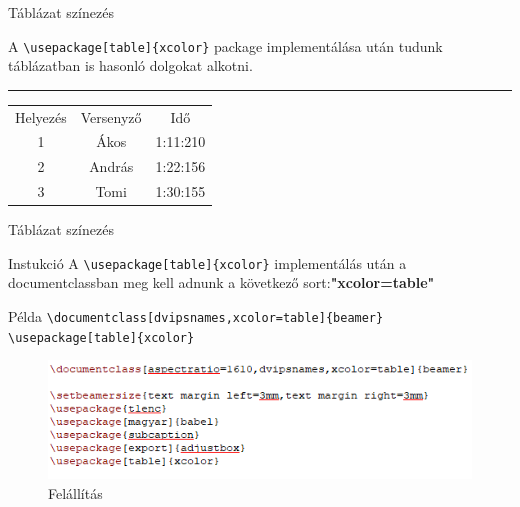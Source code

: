 \documentclass[aspectratio=1610, dvipsnames, xcolor=table]{beamer}
\begin{document}
    \begin{frame}[fragile]{Táblázat színezés}
        \begin{center}
            A \verb!\usepackage[table]{xcolor}! package implementálása után tudunk táblázatban is hasonló dolgokat alkotni.
            \noindent
            {\color{Dandelion} \rule{\linewidth}{1mm}}
        \end{center}

        \vfill
        \begin{center}
            \begin{tabular}{|c|c|c|}
                \hline
                \rowcolor{Apricot}Helyezés & Versenyző & Idő \\
                \cellcolor{ForestGreen}1 & \cellcolor{Orchid}Ákos & \cellcolor{Aquamarine}1:11:210 \\
                \cellcolor{Yellow}2  & \cellcolor{Mulberry}András & \cellcolor{Emerald}1:22:156  \\
                \cellcolor{BurntOrange}3 & \cellcolor{Plum}Tomi  &  \cellcolor{PineGreen}1:30:155 \\
                \hline
            \end{tabular}
        \end{center}
    \end{frame}

    \begin{frame}[fragile]{Táblázat színezés}
        \begin{block}{Instukció}
            A \verb!\usepackage[table]{xcolor}! implementálás után a documentclassban meg kell adnunk a következő sort:\textbf{"xcolor=table"}
        \end{block} 
        \begin{exampleblock}{Példa}
        {
            \verb!\documentclass[dvipsnames,xcolor=table]{beamer}!
            \verb!\usepackage[table]{xcolor}!
        }
        \end{exampleblock}	
        \begin{figure}[H]
            \includegraphics[scale=0.8]{img/tablesetup.png}
            \caption{Felállítás}
        \end{figure}
    \end{frame}
\end{document}
